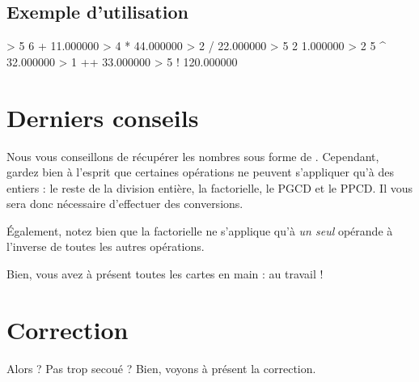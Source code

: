\subsection{Exemple d'utilisation}
\label{exemple-dutilisation}

\begin{C}
> 5 6 +
11.000000
> 4 *
44.000000
> 2 /
22.000000
> 5 2 %
1.000000
> 2 5 ^
32.000000
> 1 ++
33.000000
> 5 !
120.000000
\end{C}

\section{Derniers conseils}
\label{derniers-conseils}

Nous vous conseillons de récupérer les nombres sous forme de
. Cependant, gardez bien à l'esprit que certaines
opérations ne peuvent s'appliquer qu'à des entiers : le reste de la
division entière, la factorielle, le PGCD et le PPCD. Il vous sera donc
nécessaire d'effectuer des conversions.

Également, notez bien que la factorielle ne s'applique qu'à \emph{un
seul} opérande à l'inverse de toutes les autres opérations.

Bien, vous avez à présent toutes les cartes en main : au travail !

\section{Correction}
\label{correction-13}

Alors ? Pas trop secoué ?
Bien, voyons à présent la correction.

